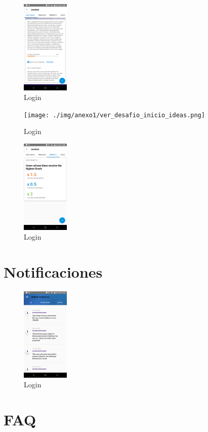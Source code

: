 \begin{figure}[!h]
	\begin{center}
		\includegraphics[width=0.2\textwidth]{./img/anexo1/ver_desafio_inicio_cont.png}
		\caption{Login}
		\label{fig:ver_desafio_inicio_cont}
	\end{center}
\end{figure}

\begin{figure}[!h]
	\begin{center}
		\texttt{[image: ./img/anexo1/ver\_desafio\_inicio\_ideas.png]}
		\caption{Login}
		\label{fig:ver_desafio_inicio_ideas}
	\end{center}
\end{figure}

\begin{figure}[!h]
	\begin{center}
		\includegraphics[width=0.2\textwidth]{./img/anexo1/ver_desafio_beneficios.png}
		\caption{Login}
		\label{fig:ver_desafio_inicio_beneficios}
	\end{center}
\end{figure}


\section{Notificaciones}

\begin{figure}[!h]
	\begin{center}
		\includegraphics[width=0.2\textwidth]{./img/anexo1/notificaciones_all.png}
		\caption{Login}
		\label{fig:notificaciones}
	\end{center}
\end{figure}

\section{FAQ}
